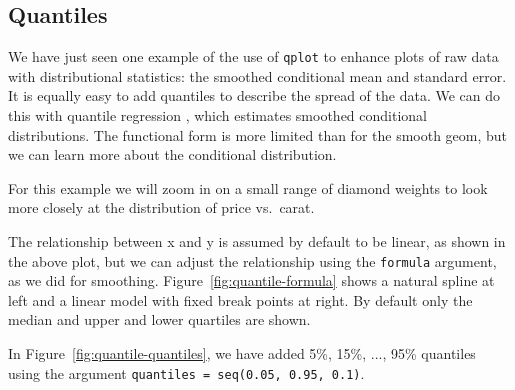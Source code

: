 \subsection{Quantiles}
\label{sub:quantile}

We have just seen one example of the use of {\tt qplot} to enhance plots of raw data with distributional statistics: the smoothed conditional mean and standard error.  It is equally easy to add quantiles to describe the spread of the data.  We can do this with quantile regression \citep{koenker:2005}, which estimates smoothed conditional distributions.  The functional form is more limited than for the smooth geom, but we can learn more about the conditional distribution.

For this example we will zoom in on a small range of diamond weights to look more closely at the distribution of price vs.\ carat.

% 


The relationship between x and y is assumed by default to be linear, as shown in the above plot, but we can adjust the relationship using the {\tt formula} argument, as we did for smoothing. Figure~\ref{fig:quantile-formula} shows a natural spline at left and a linear model with fixed break points at right.  By default only the median and upper and lower quartiles are shown.

In Figure~\ref{fig:quantile-quantiles}, we have added 5\%, 15\%, ..., 95\% quantiles using the argument {\tt quantiles = seq(0.05, 0.95, 0.1)}.

% 


% 


